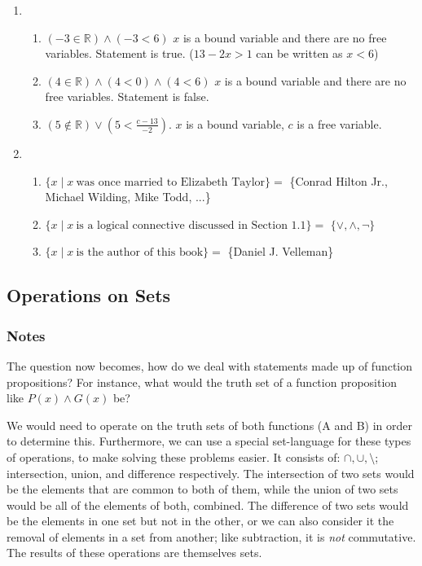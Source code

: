 \documentclass[a4paper, 11pt]{article}
\newcommand\setItemnumber[1]{\setcounter{enumi}{\numexpr#1-1\relax}}
\begin{document}
\begin{enumerate}
\begin{enumerate}
        \end{enumerate}
  \item
        \begin{enumerate}
          \item $(-3 \in \mathbb{R}) \wedge (-3 < 6)$ $x$ is a bound variable and there are no free variables. Statement is true. ($13-2x>1$ can be written as $x<6$)
          \item $(4 \in \mathbb{R}) \wedge (4 < 0) \wedge (4 < 6)$ $x$ is a bound variable and there are no free variables. Statement is false.
          \item $(5 \notin \mathbb{R}) \vee (5 < \frac{c-13}{-2})$. $x$ is a bound variable, $c$ is a free variable.
        \end{enumerate}
        \setItemnumber{8}
  \item
        \begin{enumerate}
          \item $\{x \mid x~ \text{was once married to Elizabeth Taylor}\} =$ \{Conrad Hilton Jr., Michael Wilding, Mike Todd, ...\}
          \item $\{x \mid x~ \text{is a logical connective discussed in Section 1.1}\} =$ $\{\vee, \wedge, \neg\}$
          \item $\{x \mid x~ \text{is the author of this book}\} =$ \{Daniel J. Velleman\}
        \end{enumerate}
\end{enumerate}


\clearpage

\subsection{Operations on Sets}
\subsubsection{Notes}
The question now becomes, how do we deal with statements made up of function propositions? For instance, what would the truth set of a function proposition like $P(x) \wedge G(x)$ be?

We would need to operate on the truth sets of both functions (A and B) in order to determine this. Furthermore, we can use a special set-language for these types of operations, to make solving these problems easier. It consists of: $\cap, \cup, \setminus$; intersection, union, and difference respectively. The intersection of two sets would be the elements that are common to both of them, while the union of two sets would be all of the elements of both, combined. The difference of two sets would be the elements in one set but not in the other, or we can also consider it the removal of elements in a set from another; like subtraction, it is \textit{not} commutative. The results of these operations are themselves sets.
\end{document}
